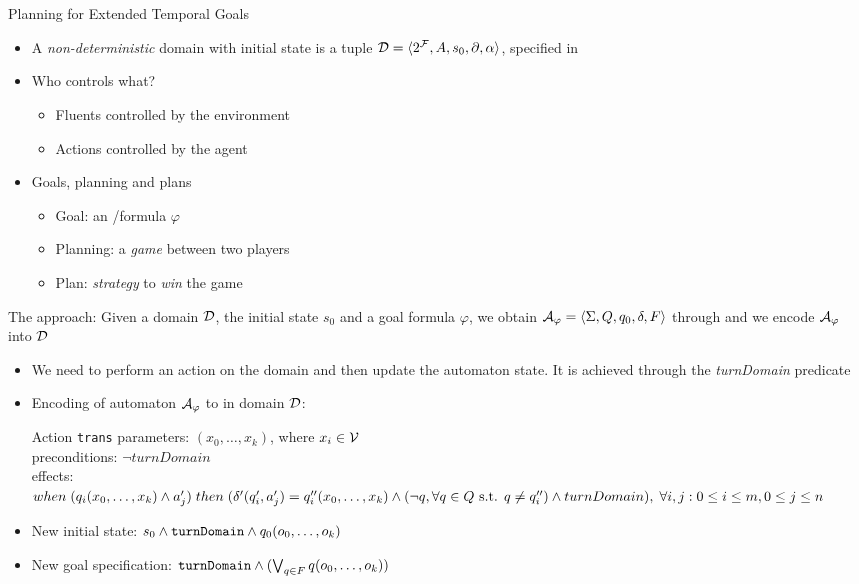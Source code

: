 \documentclass{beamer}
\begin{document}
\section{\FONDFOR}
\begin{frame}{\FOND Planning for Extended Temporal Goals}
\begin{itemize}
\item A \textit{non-deterministic} domain with initial state is a tuple $\mathcal{D} = \langle 2^{\mathcal{F}}, A, s_0, \partial, \alpha \rangle$, specified in \PDDL

\item Who controls what?
\begin{itemize}
\item Fluents controlled by the environment
\item Actions controlled by the agent
\end{itemize}

\item Goals, planning and plans
\begin{itemize}
\item Goal: an \LTLf/\PLTL formula $\varphi$
\item Planning: a \emph{game} between two players
\item Plan: \emph{strategy} to \emph{win} the game
\end{itemize}
\end{itemize}

\end{frame}

\begin{frame}
The \FONDFOR approach: Given a \PDDL domain $\mathcal{D}$, the initial state $s_0$ and a goal formula $\varphi$, we obtain $\mathcal{A}_\varphi = \langle \Sigma, Q, q_0 , \delta, F \rangle$ through \LTLfToDFA and we encode $\mathcal{A}_\varphi$ into $\mathcal{D}$
\begin{itemize}
\item We need to perform an action on the domain and then update the automaton state. It is achieved through the \textit{turnDomain} predicate

\item Encoding of automaton $\mathcal{A}_\varphi$ to \PDDL in domain $\mathcal{D}$:
\begin{block}{Action \texttt{trans}}
parameters: $(x_0, \dots, x_k)$, where $x_i \in \mathcal{V}$\\
preconditions: $\lnot turnDomain$\\
effects: $when\; (q_i(x_0, \dots, x_k) \wedge a'_j)\; then\; (\delta'(q'_i, a'_j)=q''_i(x_0, \dots, x_k) \wedge (\lnot q, \forall q \in Q \text{ s.t. } q \neq q''_i) \wedge turnDomain),\; \forall i,j: 0\leq i \leq m, 0\leq j \leq n$
\end{block}

\item New initial state: $s_0 \wedge \text{\texttt{turnDomain}} \wedge q_0(o_0,\dots,o_k)$
\item New goal specification: $\text{\texttt{turnDomain}} \wedge (\bigvee_{q \in F} q(o_0,\dots,o_k))$
\end{itemize}

\end{frame}
\end{document}
